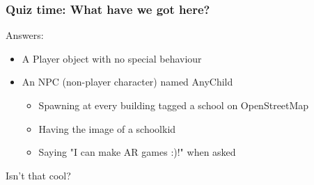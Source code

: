 \documentclass[aspectratio=43]{beamer}
\begin{document}

 \begin{frame}
  \frametitle{Quiz time: What have we got here?}

  Answers:

  \begin{itemize}
   \item{A Player object with no special behaviour}
   \item{An NPC (non-player character) named AnyChild
    \begin{itemize}
     \item{Spawning at every building tagged a school on OpenStreetMap}
     \item{Having the image of a schoolkid}
     \item{Saying "I can make AR games :)!" when asked}
    \end{itemize}
   }
  \end{itemize}

  Isn't that cool?
 \end{frame}

\end{document}

